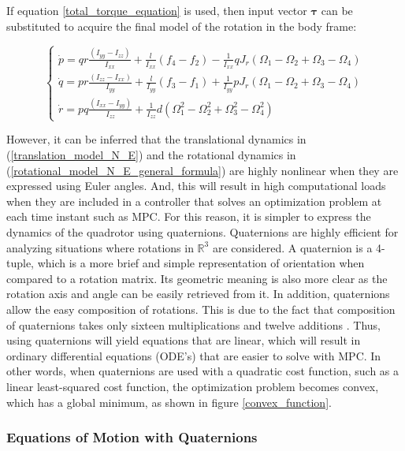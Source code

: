 \documentclass{thesisreport}
\begin{document}
If equation \ref{total_torque_equation} is used, then input vector $\bm{\tau}$ can be substituted to acquire the final model of the rotation in the body frame:

\begin{equation}
\begin{cases}
\dot{p} = qr \frac{(I_{yy}-I_{zz})}{I_{xx}} + \frac{l}{I_{xx}}(f_4-f_2) - \frac{1}{I_{xx}}qJ_r (\Omega_1 - \Omega_2 + \Omega_3 - \Omega_4) \\
\dot{q} = pr \frac{(I_{zz}-I_{xx})}{I_{yy}} + \frac{l}{I_{yy}}(f_3-f_1) + \frac{1}{I_{yy}}pJ_r (\Omega_1 - \Omega_2 + \Omega_3 - \Omega_4) \\
\dot{r} = pq \frac{(I_{xx}-I_{yy})}{I_{zz}} + \frac{1}{I_{zz}} d (\Omega_1^2 -\Omega_2^2 + \Omega_3^2 - \Omega_4^2)
\end{cases}
\end{equation}

However, it can be inferred that the translational dynamics in  (\ref{translation_model_N_E}) and the rotational dynamics in (\ref{rotational_model_N_E_general_formula}) are highly nonlinear when they are expressed using Euler angles. And, this will result in high computational loads when they are included in a controller that solves an optimization problem at each time instant such as MPC. For this reason, it is simpler to express the dynamics of the quadrotor using quaternions. Quaternions are highly efficient for analyzing situations where rotations in $\mathbb{R}^3$ are considered. A quaternion is a 4-tuple, which is a more brief and simple representation of orientation when compared to a rotation matrix. Its geometric meaning is also more clear as the rotation axis and angle can be easily retrieved from it. In addition, quaternions allow the easy composition of rotations. This is due to the fact that composition of quaternions takes only sixteen multiplications and twelve additions \cite{jia_2013}. Thus, using quaternions will yield equations that are linear, which will result in ordinary differential equations (ODE's) that are easier to solve with MPC. In other words, when quaternions are used with a quadratic cost function, such as a linear least-squared cost function, the optimization problem becomes convex, which has a global minimum, as shown in figure \ref{convex_function}.

\newpage

\subsubsection{Equations of Motion with Quaternions}\label{equations_of_motion_quaternion_form}
\end{document}
